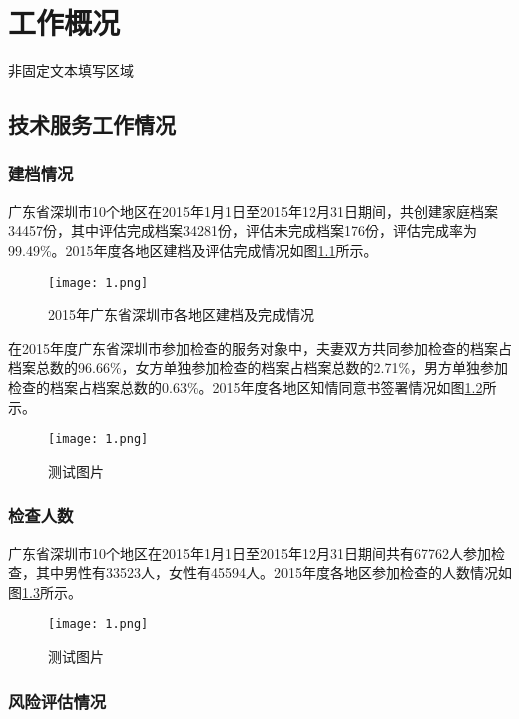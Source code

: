 \chapter{工作概况}

非固定文本填写区域

\section{技术服务工作情况}

\subsection{建档情况}

广东省深圳市10个地区在2015年1月1日至2015年12月31日期间，共创建家庭档案34457份，其中评估完成档案34281份，评估未完成档案176份，评估完成率为99.49\%。2015年度各地区建档及评估完成情况如图\ref{图1}所示。
\begin{figure}[htbp]
	\centering
	\texttt{[image: 1.png]}
	\caption{2015年广东省深圳市各地区建档及完成情况}
	\label{图1}
\end{figure}




在2015年度广东省深圳市参加检查的服务对象中，夫妻双方共同参加检查的档案占档案总数的96.66\%，女方单独参加检查的档案占档案总数的2.71\%，男方单独参加检查的档案占档案总数的0.63\%。2015年度各地区知情同意书签署情况如图\ref{图2}所示。
\begin{figure}[htbp]
	\centering
	\texttt{[image: 1.png]}
	\caption{测试图片}
	\label{图2}
\end{figure}


 

\subsection{检查人数}

广东省深圳市10个地区在2015年1月1日至2015年12月31日期间共有67762人参加检查，其中男性有33523人，女性有45594人。2015年度各地区参加检查的人数情况如图\ref{图3}所示。
\begin{figure}[htbp]
	\centering
	\texttt{[image: 1.png]}
	\caption{测试图片}
	\label{图3}
\end{figure}




\subsection{风险评估情况}

